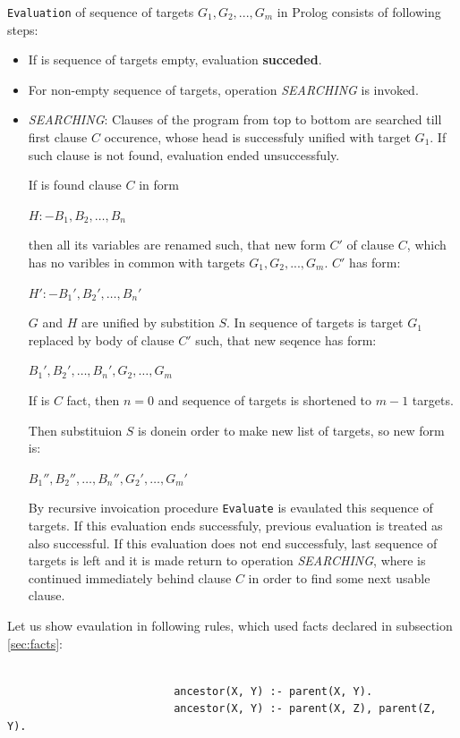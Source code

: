 \documentclass[11pt,twoside,a4paper]{book}
\begin{document}
\verb|Evaluation| of sequence of targets $G_1, G_2,..., G_m$ in Prolog consists
of following steps:
\begin{itemize}
  \item If is sequence of targets empty, evaluation \textbf{succeded}.
  \item For non-empty sequence of targets, operation \textit{SEARCHING} is
  invoked.
  \item \textit{SEARCHING}: Clauses of the program from top to bottom are
  searched till first clause $C$ occurence, whose head is successfuly
  unified with target $G_1$. If such clause is not found, evaluation ended
  unsuccessfuly.
  
  If is found clause $C$ in form
 \begin{center}
                          $H :- B_1, B_2,\ldots, B_n$
\end{center}
then all its variables are renamed such, that new form $C'$ of clause $C$, which
has no varibles in common with targets $G_1, G_2,..., G_m$. $C'$ has form:
\begin{center}
                          $H' :- B_1', B_2',\ldots, B_n'$
\end{center}
$G$ and $H$ are unified by substition $S$.
In sequence of targets is target $G_1$ replaced by body of clause $C'$ such,
that new seqence has form:
\begin{center}
                          $B_1', B_2',\ldots, B_n', G_2,\ldots, G_m$
\end{center}
If is $C$ fact, then $n = 0$ and sequence of targets is shortened to $m - 1$
targets.

Then substituion $S$ is donein order to make new list of targets, so new form
is:
\begin{center}
                          $B_1'', B_2'',\ldots, B_n'', G_2',\ldots, G_m'$
\end{center}


By recursive invoication procedure \verb|Evaluate| is evaulated this sequence of
targets. If this evaluation ends successfuly, previous evaluation is treated as
also successful. If this evaluation does not end successfuly, last sequence of
targets is left and it is made return to operation \textit{SEARCHING}, where is
continued immediately behind clause $C$ in order to find some next usable
clause.
\end{itemize}
Let us show evaulation in following rules, which used facts declared in
subsection \ref{sec:facts}:\\
\\
\begin{verbatim}
                          ancestor(X, Y) :- parent(X, Y).
                          ancestor(X, Y) :- parent(X, Z), parent(Z, Y).
\end{verbatim}
\end{document}
